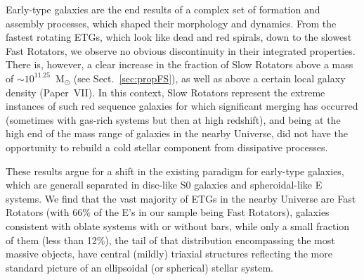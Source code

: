 \documentclass[useAMS,usenatbib,usegraphicx]{mn2e}
\begin{document}
Early-type galaxies are the end results of a complex set of formation and
assembly processes, which shaped their morphology and dynamics. 
From the fastest rotating ETGs, which look like dead and red spirals, down to
the slowest Fast Rotators, we observe no obvious discontinuity in their
integrated properties. There is, however, a clear increase in the fraction
of Slow Rotators above a mass of $\sim 10^{11.25}$~M$_{\odot}$ (see
Sect.~\ref{sec:propFS}), as well as above a certain local galaxy density (Paper~VII).
In this context, Slow Rotators represent the extreme instances
of such red sequence galaxies for which significant merging has occurred (sometimes with
gas-rich systems but then at high redshift), and being at the high end of the mass range of galaxies in
the nearby Universe, did not have the opportunity to rebuild a cold stellar
component from dissipative processes.

These results argue for a shift in the existing paradigm for early-type galaxies, 
which are generall separated in disc-like S0 galaxies and spheroidal-like E systems. 
We find that the vast majority of ETGs in the nearby Universe are Fast Rotators (with 66\% of the
E's in our sample being Fast Rotators), 
galaxies consistent with oblate systems with or without bars, 
while only a small fraction of them (less than 12\%), the
tail of that distribution encompassing the most massive objects, 
have central (mildly) triaxial structures reflecting the more standard picture of an
ellipsoidal (or spherical) stellar system.
\end{document}
